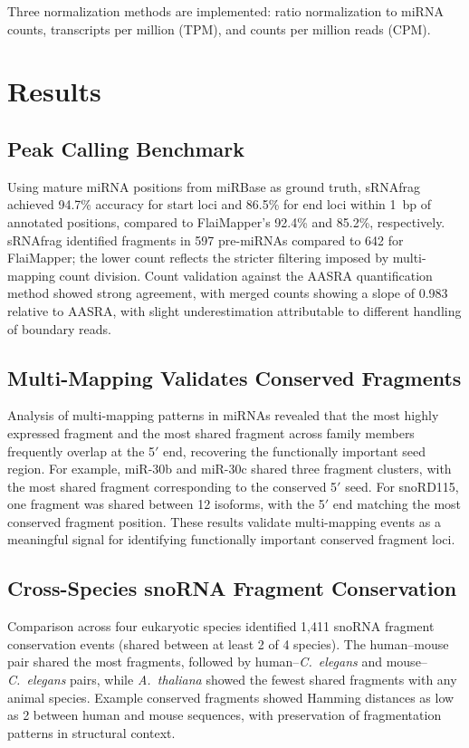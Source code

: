 \documentclass[11pt]{article}
\begin{document}
Three normalization methods are implemented: ratio normalization to miRNA counts, transcripts per million (TPM), and counts per million reads (CPM).

\section{Results}

\subsection{Peak Calling Benchmark}

Using mature miRNA positions from miRBase as ground truth, sRNAfrag achieved 94.7\% accuracy for start loci and 86.5\% for end loci within 1~bp of annotated positions, compared to FlaiMapper's 92.4\% and 85.2\%, respectively. sRNAfrag identified fragments in 597 pre-miRNAs compared to 642 for FlaiMapper; the lower count reflects the stricter filtering imposed by multi-mapping count division. Count validation against the AASRA quantification method showed strong agreement, with merged counts showing a slope of 0.983 relative to AASRA, with slight underestimation attributable to different handling of boundary reads.

\subsection{Multi-Mapping Validates Conserved Fragments}

Analysis of multi-mapping patterns in miRNAs revealed that the most highly expressed fragment and the most shared fragment across family members frequently overlap at the 5$'$ end, recovering the functionally important seed region. For example, miR-30b and miR-30c shared three fragment clusters, with the most shared fragment corresponding to the conserved 5$'$ seed. For snoRD115, one fragment was shared between 12 isoforms, with the 5$'$ end matching the most conserved fragment position. These results validate multi-mapping events as a meaningful signal for identifying functionally important conserved fragment loci.

\subsection{Cross-Species snoRNA Fragment Conservation}

Comparison across four eukaryotic species identified 1,411 snoRNA fragment conservation events (shared between at least 2 of 4 species). The human--mouse pair shared the most fragments, followed by human--\textit{C.~elegans} and mouse--\textit{C.~elegans} pairs, while \textit{A.~thaliana} showed the fewest shared fragments with any animal species. Example conserved fragments showed Hamming distances as low as 2 between human and mouse sequences, with preservation of fragmentation patterns in structural context.
\end{document}

